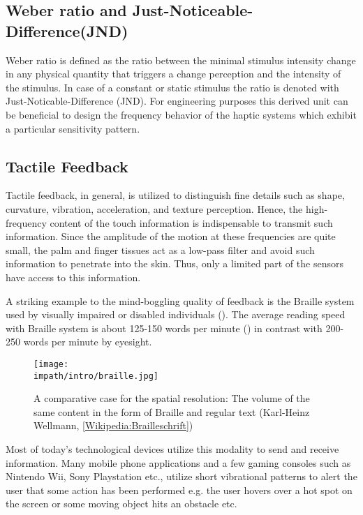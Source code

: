 \subsection{Weber ratio and Just-Noticeable-Difference(JND) }

Weber ratio is defined as the ratio between the minimal stimulus intensity change in any physical quantity that triggers a change perception and the intensity of the stimulus. In case of a constant or static stimulus the ratio is denoted with Just-Noticable-Difference (JND). For engineering purposes this derived unit can be beneficial to design the frequency behavior of the haptic systems which exhibit a particular sensitivity pattern.


\subsection{Tactile Feedback}

Tactile feedback, in general, is utilized to distinguish fine details such as shape, curvature, vibration, acceleration, and texture perception. Hence, the high-frequency content of the touch information is indispensable to transmit such information. Since the amplitude of the motion at these frequencies are quite small, the palm and finger tissues act as a low-pass filter and avoid such information to penetrate into the skin. Thus, only a limited part of the sensors have access to this information.

A striking example to the mind-boggling quality of feedback is the Braille system used by visually impaired or disabled individuals (). The average reading speed with Braille system is about 125-150 words per minute (\cite{americanblind}) in contrast with 200-250 words per minute by eyesight. 

\begin{figure}%
\centering
\texttt{[image: \\impath/intro/braille.jpg]}%
\caption[The length comparison of the same content in the form of Braille and 
regular text]{A comparative case for the spatial resolution: The volume of the same 
content in the form of Braille and regular text (Karl-Heinz Wellmann, 
\href{http://de.wikipedia.org/wiki/Brailleschrift}{[Wikipedia:Brailleschrift]})}%
\label{fig:braille}%
\end{figure}

Most of today's technological devices utilize this modality to send and receive information. Many mobile phone applications and a few gaming consoles such as Nintendo Wii\raisebox{0.5ex}{\scriptsize\texttrademark}, Sony Playstation\raisebox{0.5ex}{\scriptsize\texttrademark} etc., utilize short vibrational patterns to alert the user that some action has been performed e.g. the user hovers over a hot spot on the screen or some moving object hits an obstacle etc. 

